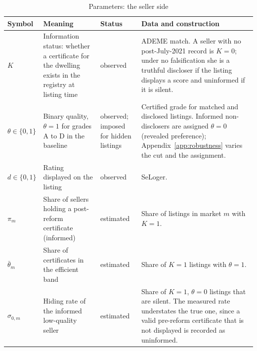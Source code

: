 \begin{table}[htbp]
\centering
\caption{Parameters: the seller side}
\label{tab:app_seller}
\footnotesize\renewcommand{\arraystretch}{1.25}
\begin{tabular}{@{}llll@{}}
\toprule\toprule
\textbf{Symbol} & \textbf{Meaning} & \textbf{Status} & \textbf{Data and construction} \\
\midrule
\parbox[t]{.09\textwidth}{\raggedright $K$} & \parbox[t]{.30\textwidth}{\raggedright Information status: whether a certificate for the dwelling exists in the registry at listing time} & \parbox[t]{.14\textwidth}{\raggedright observed} & \parbox[t]{.37\textwidth}{\raggedright ADEME match. A seller with no post-July-2021 record is $K=0$; under no falsification she is a truthful discloser if the listing displays a score and uninformed if it is silent.} \\[12pt]
\parbox[t]{.09\textwidth}{\raggedright $\theta\in\{0,1\}$} & \parbox[t]{.30\textwidth}{\raggedright Binary quality, $\theta=1$ for grades A to D in the baseline} & \parbox[t]{.14\textwidth}{\raggedright observed; imposed for hidden listings} & \parbox[t]{.37\textwidth}{\raggedright Certified grade for matched and disclosed listings. Informed non-disclosers are assigned $\theta=0$ (revealed preference); Appendix~\ref{app:robustness} varies the cut and the assignment.} \\[12pt]
\parbox[t]{.09\textwidth}{\raggedright $d\in\{0,1\}$} & \parbox[t]{.30\textwidth}{\raggedright Rating displayed on the listing} & \parbox[t]{.14\textwidth}{\raggedright observed} & \parbox[t]{.37\textwidth}{\raggedright SeLoger.} \\[12pt]
\parbox[t]{.09\textwidth}{\raggedright $\pi_m$} & \parbox[t]{.30\textwidth}{\raggedright Share of sellers holding a post-reform certificate (informed)} & \parbox[t]{.14\textwidth}{\raggedright estimated} & \parbox[t]{.37\textwidth}{\raggedright Share of listings in market $m$ with $K=1$.} \\[12pt]
\parbox[t]{.09\textwidth}{\raggedright $\bar\theta_m$} & \parbox[t]{.30\textwidth}{\raggedright Share of certificates in the efficient band} & \parbox[t]{.14\textwidth}{\raggedright estimated} & \parbox[t]{.37\textwidth}{\raggedright Share of $K=1$ listings with $\theta=1$.} \\[12pt]
\parbox[t]{.09\textwidth}{\raggedright $\sigma_{0,m}$} & \parbox[t]{.30\textwidth}{\raggedright Hiding rate of the informed low-quality seller} & \parbox[t]{.14\textwidth}{\raggedright estimated} & \parbox[t]{.37\textwidth}{\raggedright Share of $K=1$, $\theta=0$ listings that are silent. The measured rate understates the true one, since a valid pre-reform certificate that is not displayed is recorded as uninformed.} \\[12pt]

\end{tabular}
\end{table}

